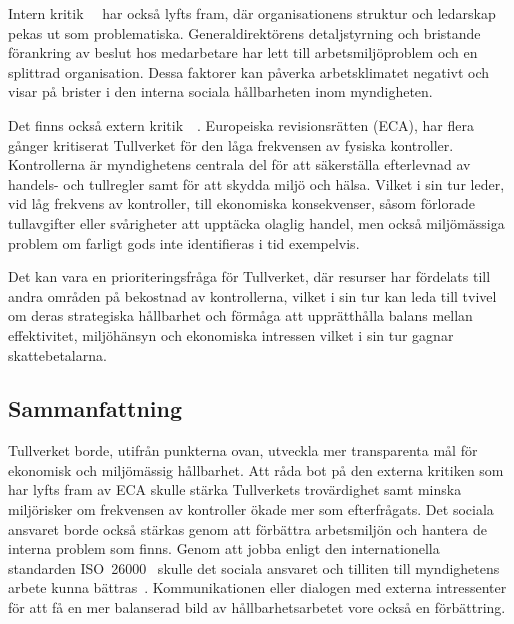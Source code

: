 Intern kritik~\cite{ex-uppror}~\cite{svd-kritik} har också lyfts fram, där
organisationens struktur och ledarskap pekas ut som problematiska.
Generaldirektörens detaljstyrning och bristande förankring av beslut hos
medarbetare har lett till arbetsmiljöproblem och en splittrad organisation.
Dessa faktorer kan påverka arbetsklimatet negativt och visar på brister i den
interna sociala hållbarheten inom myndigheten.

Det finns också extern kritik~\cite{eu-riksdagen}~\cite{eu-portalen}.
Europeiska revisionsrätten (ECA), har flera gånger kritiserat Tullverket för
den låga frekvensen av fysiska kontroller. Kontrollerna är myndighetens
centrala del för att säkerställa efterlevnad av handels- och tullregler samt
för att skydda miljö och hälsa. Vilket i sin tur leder, vid låg frekvens av
kontroller, till ekonomiska konsekvenser, såsom förlorade tullavgifter eller
svårigheter att upptäcka olaglig handel, men också miljömässiga problem om
farligt gods inte identifieras i tid exempelvis.

Det kan vara en prioriteringsfråga för Tullverket, där resurser har fördelats
till andra områden på bekostnad av kontrollerna, vilket i sin tur kan leda till
tvivel om deras strategiska hållbarhet och förmåga att upprätthålla balans
mellan effektivitet, miljöhänsyn och ekonomiska intressen vilket i sin tur
gagnar skattebetalarna.

\subsection{Sammanfattning}

Tullverket borde, utifrån punkterna ovan, utveckla mer transparenta mål för
ekonomisk och miljömässig hållbarhet. Att råda bot på den externa kritiken
som har lyfts fram av ECA skulle stärka Tullverkets trovärdighet samt minska
miljörisker om frekvensen av kontroller ökade mer som efterfrågats. Det sociala
ansvaret borde också stärkas genom att förbättra arbetsmiljön och hantera de
interna problem som finns. Genom att jobba enligt den internationella
standarden ISO~26000~\cite{iso26000} skulle det sociala ansvaret och tilliten
till myndighetens arbete kunna bättras~\cite{boken-soc}. Kommunikationen eller
dialogen med externa intressenter för att få en mer balanserad bild av
hållbarhetsarbetet vore också en förbättring.
